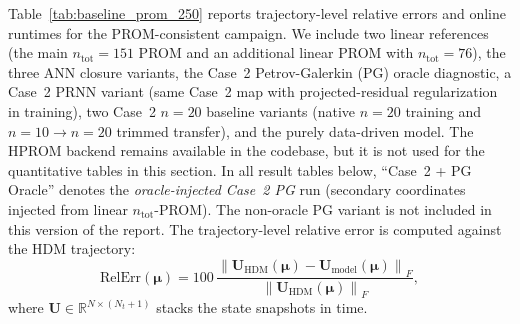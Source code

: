 \documentclass[11pt]{article}
\begin{document}
Table~\ref{tab:baseline_prom_250} reports trajectory-level relative errors and online runtimes for the PROM-consistent campaign. We include two linear references (the main $n_{\mathrm{tot}}=151$ PROM and an additional linear PROM with $n_{\mathrm{tot}}=76$), the three ANN closure variants, the Case~2 Petrov-Galerkin (PG) oracle diagnostic, a Case~2 PRNN variant (same Case~2 map with projected-residual regularization in training), two Case~2 $n=20$ baseline variants (native $n=20$ training and $n=10\to n=20$ trimmed transfer), and the purely data-driven model. The HPROM backend remains available in the codebase, but it is not used for the quantitative tables in this section.
In all result tables below, ``Case~2 + PG Oracle'' denotes the \emph{oracle-injected Case~2 PG} run (secondary coordinates injected from linear $n_{\mathrm{tot}}$-PROM). The non-oracle PG variant is not included in this version of the report.
The trajectory-level relative error is computed against the HDM trajectory:
\[
\mathrm{RelErr}(\bm\mu)
=
100\,
\frac{\left\|\mathbf U_{\mathrm{HDM}}(\bm\mu)-\mathbf U_{\mathrm{model}}(\bm\mu)\right\|_F}
{\left\|\mathbf U_{\mathrm{HDM}}(\bm\mu)\right\|_F},
\]
where $\mathbf U\in\mathbb R^{N\times (N_t+1)}$ stacks the state snapshots in time.
\end{document}
